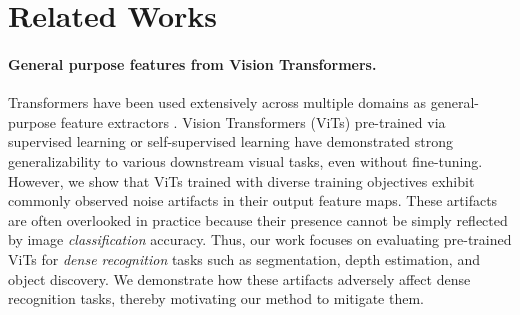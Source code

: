 \section{Related Works}
\label{sec:related}

\paragraph{General purpose features from Vision Transformers.} Transformers have been used extensively across multiple domains as general-purpose feature extractors \cite{brown2020language,radford2019language,chowdhery2022palm,touvron2023llama,devlin2019bert, raffel2023exploring}.
Vision Transformers \cite{dosovitskiy2021image} (ViTs) pre-trained via supervised learning \cite{vaswani2023attention, touvron2022deit,kirillov2023segment} or self-supervised learning \cite{zhou2021ibot,he2022masked,caron2021emerging,oquab2023dinov2} have demonstrated strong generalizability to various downstream visual tasks, even without fine-tuning. However, we show that ViTs trained with diverse training objectives exhibit commonly observed noise artifacts in their output feature maps. These artifacts are often overlooked in practice because their presence cannot be simply reflected by image \textit{classification} accuracy. Thus, our work focuses on evaluating pre-trained ViTs for \textit{dense recognition} tasks such as segmentation, depth estimation, and object discovery. We demonstrate how these artifacts adversely affect dense recognition tasks, thereby motivating our method to mitigate them.

